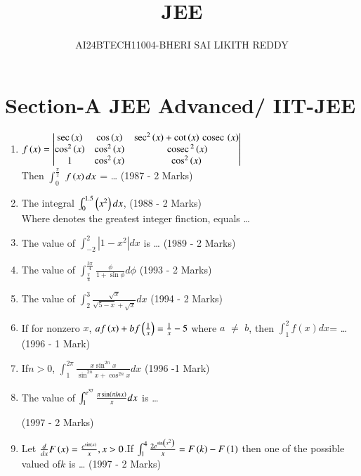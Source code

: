 \documentclass[journal,12pt,twocolumn]{IEEEtran}
\theoremstyle{remark}
\begin{document}


\title{JEE}
\author{AI24BTECH11004-BHERI SAI LIKITH REDDY}
\maketitle
\newpage
\bigskip

\renewcommand{\thefigure}{\theenumi}
\renewcommand{\thetable}{\theenumi}

\section{Section-A JEE Advanced/ IIT-JEE}
\begin{enumerate}
	\item $f\left(x\right) = \begin{vmatrix}
			\sec\left(x\right) & \cos\left(x\right) & \sec^2\left(x\right) + \cot\left(x\right) \,\text{cosec}\, \left(x\right)\\
		\cos^2\left(x\right) & \cos^2\left(x\right) & \,\text{cosec}\,^2\left(x\right)\\
		1 & \cos^2\left(x\right) & \cos^2\left(x\right)\end{vmatrix}$\\
		Then $\int_0^{\frac{\pi}{2}}$ $f\left(x\right)dx$ = \dots
\hfill{(1987 - 2 Marks)}\\ 
		
\item The integral $\int_0^{1.5} \left(x^2\right)dx$,
\hfill{(1988 - 2 Marks)}\\
	Where \sbrak denotes the greatest integer finction, equals \dots \\
		
\item The value of  $\int_{-2}^2 |1-x^2|dx$ is \dots
	\hfill{(1989 - 2 Marks)}\\
		
\item The value of $\int_{\frac{\pi}{4}}^{\frac{3\pi}{4}} \frac{\phi}{1+ \sin \phi} d\phi$
\hfill{(1993 - 2 Marks)}\\
		
\item The value of $\int_2^3 \frac{\sqrt x }{\sqrt {5-x}+\sqrt {x}} dx$
\hfill{(1994 - 2 Marks)}\\
		
\item If for nonzero $x$, $af\left(x\right)+bf \left(\frac{1}{x} \right) = \frac{1}{x}-5 $ where $a$ 
	$\neq$  $b$, then $\int_1^2f(x)dx$= \dots
\hfill{(1996 - 1 Mark)}\\
		
\item If$ n>0$, $\int_1^{2\pi} \frac {x \sin ^{2n}x}{\sin^{2n}x+\cos^{2n} x} dx $
\hfill{(1996 -1 Mark)}\\
		
\item The value of $\int_1^{e^{37}} \frac {\pi \sin \left(\pi lnx\right)}{x} dx$ is \dots

	\hfill{(1997 - 2 Marks)}\\
		
\item Let $\frac {d}{dx}F\left(x\right)=\frac {e^{\sin\left(x\right)}}{x},x>0$.If $\int_1^4 \frac{2e^{\sin \left(x^2\right)}}{x}=F\left(k\right)-F\left(1\right)$ then one of the possible valued of$ k$ is \dots
\hfill{(1997 - 2 Marks)}\\
\end{enumerate}
\end{document}
